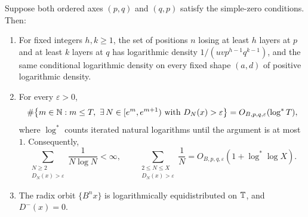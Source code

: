\documentclass[11pt]{article}
\begin{document}
\begin{theorem}\label{th:sparse}
Suppose both ordered axes $(p,q)$ and $(q,p)$ satisfy the simple-zero conditions. Then:
\begin{enumerate}[label=\textup{(\roman*)},leftmargin=2em,itemsep=2pt]
\item For fixed integers $h,k\ge1$, the set of positions $n$ losing at least $h$ layers at $p$ and at least $k$ layers at $q$ has logarithmic density $1/(uvp^{h-1}q^{k-1})$, and the same conditional logarithmic density on every fixed shape $(a,d)$ of positive logarithmic density.
\item For every $\varepsilon>0$,
\[
 \#\bigl\{m\in\N:m\le T,\ \exists\,N\in[e^m,e^{m+1})\text{ with }D_N(x)>\varepsilon\bigr\}
       =O_{B,p,q,\varepsilon}(\log^*T),
\]
where $\log^*$ counts iterated natural logarithms until the argument is at most $1$. Consequently,
\[
 \sum_{\substack{N\ge2\\D_N(x)>\varepsilon}}\frac1{N\log N}<\infty,\qquad
 \sum_{\substack{2\le N\le X\\D_N(x)>\varepsilon}}\frac1N
       =O_{B,p,q,\varepsilon}(1+\log^*\log X).
\]
\item The radix orbit $\{B^n x\}$ is logarithmically equidistributed on $\mathbb T$, and $D^-(x)=0$.
\end{enumerate}
\end{theorem}
\end{document}
